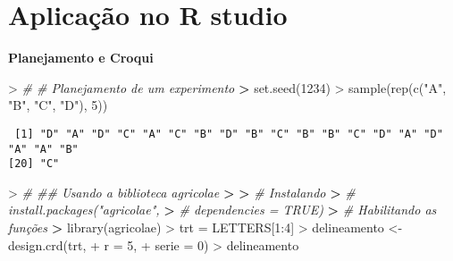 \documentclass[
]{book}
\newenvironment{Shaded}{\begin{snugshade}}{\end{snugshade}}
\newcommand{\AttributeTok}[1]{\textcolor[rgb]{0.77,0.63,0.00}{#1}}
\newcommand{\CommentTok}[1]{\textcolor[rgb]{0.56,0.35,0.01}{\textit{#1}}}
\newcommand{\DecValTok}[1]{\textcolor[rgb]{0.00,0.00,0.81}{#1}}
\newcommand{\ErrorTok}[1]{\textcolor[rgb]{0.64,0.00,0.00}{\textbf{#1}}}
\newcommand{\FunctionTok}[1]{\textcolor[rgb]{0.00,0.00,0.00}{#1}}
\newcommand{\NormalTok}[1]{#1}
\newcommand{\OtherTok}[1]{\textcolor[rgb]{0.56,0.35,0.01}{#1}}
\newcommand{\SpecialCharTok}[1]{\textcolor[rgb]{0.00,0.00,0.00}{#1}}
\newcommand{\StringTok}[1]{\textcolor[rgb]{0.31,0.60,0.02}{#1}}
\begin{document}
\hypertarget{aplicauxe7uxe3o-no-r-studio-2}{%
\section{Aplicação no R studio}\label{aplicauxe7uxe3o-no-r-studio-2}}

\textbf{Planejamento e Croqui}

\begin{Shaded}
\begin{Highlighting}[]
\SpecialCharTok{\textgreater{}} \CommentTok{\#\textquotesingle{} \# Planejamento de um experimento}
\ErrorTok{\textgreater{}} \FunctionTok{set.seed}\NormalTok{(}\DecValTok{1234}\NormalTok{)}
\SpecialCharTok{\textgreater{}} \FunctionTok{sample}\NormalTok{(}\FunctionTok{rep}\NormalTok{(}\FunctionTok{c}\NormalTok{(}\StringTok{"A"}\NormalTok{, }\StringTok{"B"}\NormalTok{, }\StringTok{"C"}\NormalTok{, }\StringTok{"D"}\NormalTok{), }\DecValTok{5}\NormalTok{))}
\end{Highlighting}
\end{Shaded}

\begin{verbatim}
 [1] "D" "A" "D" "C" "A" "C" "B" "D" "B" "C" "B" "B" "C" "D" "A" "D" "A" "A" "B"
[20] "C"
\end{verbatim}

\begin{Shaded}
\begin{Highlighting}[]
\SpecialCharTok{\textgreater{}} \CommentTok{\#\textquotesingle{} \#\# Usando a biblioteca agricolae}
\ErrorTok{\textgreater{}} 
\ErrorTok{\textgreater{}} \CommentTok{\# Instalando}
\ErrorTok{\textgreater{}} \CommentTok{\# install.packages("agricolae", }
\ErrorTok{\textgreater{}} \CommentTok{\#                  dependencies = TRUE)}
\ErrorTok{\textgreater{}} \CommentTok{\# Habilitando as funções}
\ErrorTok{\textgreater{}} \FunctionTok{library}\NormalTok{(agricolae)}
\SpecialCharTok{\textgreater{}}\NormalTok{ trt }\OtherTok{=}\NormalTok{ LETTERS[}\DecValTok{1}\SpecialCharTok{:}\DecValTok{4}\NormalTok{]}
\SpecialCharTok{\textgreater{}}\NormalTok{ delineamento }\OtherTok{\textless{}{-}} \FunctionTok{design.crd}\NormalTok{(trt,}
\SpecialCharTok{+}                            \AttributeTok{r =} \DecValTok{5}\NormalTok{,}
\SpecialCharTok{+}                            \AttributeTok{serie =} \DecValTok{0}\NormalTok{)}
\SpecialCharTok{\textgreater{}}\NormalTok{ delineamento}
\end{Highlighting}
\end{Shaded}
\end{document}
